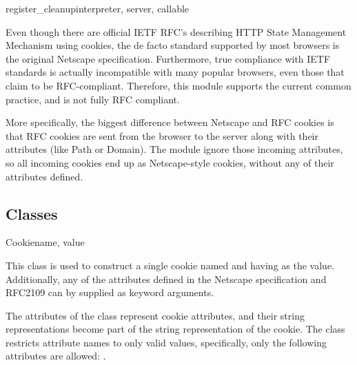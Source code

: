 \begin{funcdesc}{register_cleanup}{interpreter, server, callable}
\begin{notice}
  Even though there are official IETF RFC's describing HTTP State
  Management Mechanism using cookies, the de facto standard supported
  by most browsers is the original Netscape specification.
  Furthermore, true compliance with IETF standards is actually
  incompatible with many popular browsers, even those that claim to be
  RFC-compliant. Therefore, this module supports the current common
  practice, and is not fully RFC compliant.
  
  More specifically, the biggest difference between Netscape and RFC cookies is 
  that RFC cookies are sent from the browser to the server along with their 
  attributes (like Path or Domain). The  module ignore those 
  incoming attributes, so all incoming cookies end up as Netscape-style cookies, 
  without any of their attributes defined.
\end{notice}

\begin{seealso}
\end{seealso}

\subsection{Classes\label{pyapi-cookie-classes}}

\begin{classdesc}{Cookie}{name, value}

  This class is used to construct a single cookie named 
  and having  as the value. Additionally, any of the 
  attributes defined in the Netscape specification and RFC2109 can by
  supplied as keyword arguments.

  The attributes of the class represent cookie attributes, and their
  string representations become part of the string representation of
  the cookie. The  class restricts attribute names to
  only valid values, specifically, only the following attributes are
  allowed: .


\end{classdesc}
\end{funcdesc}
